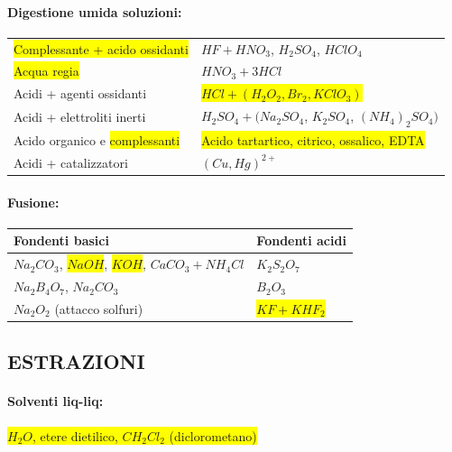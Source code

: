 \documentclass{article}
\begin{document}
\paragraph{Digestione umida soluzioni:}
\begin{center}
\begin{tabular}{l|l}
	\midrule
	\colorbox{yellow}{Complessante + acido ossidanti} & $HF + HNO_3$, $H_2SO_4$, $HClO_4$ \\
	\colorbox{yellow}{Acqua regia} & $HNO_3 + 3HCl$ \\
	Acidi + agenti ossidanti & \colorbox{yellow}{$HCl + (H_2O_2, Br_2, KClO_3)$}  \\
	Acidi + elettroliti inerti &  $H_2SO_4 + (Na_2SO_4$, $K_2SO_4$, $(NH_4)_2SO_4)$\\
	Acido organico e \colorbox{yellow}{complessanti} &  \colorbox{yellow}{Acido tartartico, citrico, ossalico, EDTA}\\
	Acidi + catalizzatori &  $(Cu, Hg)^{2+}$\\
	\bottomrule
\end{tabular}
\end{center}

\paragraph{Fusione:}
\begin{center}
\begin{tabular}{l|l}
	\toprule
	Fondenti basici & Fondenti acidi \\
	\midrule
	$Na_2CO_3$, \colorbox{yellow}{$NaOH$}, \colorbox{yellow}{$KOH$}, $CaCO_3 + NH_4Cl$ & $K_2S_2O_7$ \\
	$Na_2B_4O_7$, $Na_2CO_3$ & \underline{$B_2O_3$} \\
	$Na_2O_2$ (attacco solfuri) & \colorbox{yellow}{$KF + KHF_2$} \\
	\bottomrule
\end{tabular}
\end{center}

\subsection{ESTRAZIONI}
\paragraph{Solventi liq-liq: } \colorbox{yellow}{$H_2O$, etere dietilico, $CH_2Cl_2$ (diclorometano)}
\end{document}
